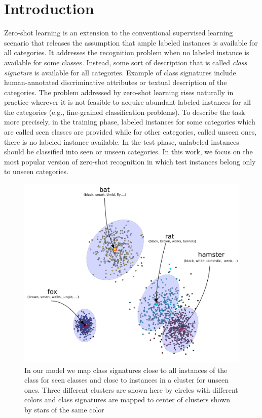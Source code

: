 \documentclass[letterpaper]{article}
\begin{document}
\section{Introduction}
Zero-shot learning \cite{bengio08,hinton09,lampert09,farhadi09} is an extension to the conventional supervised learning scenario
that releases the assumption that ample labeled instances is available for all categories. It addresses the
recognition problem when no labeled instance is available for some classes.
Instead, some sort of description that is called \textit{class signature} is available for all categories.
Example of class signatures include human-annotated discriminative attributes or textual description of the categories.
The problem addressed by zero-shot learning rises naturally in practice wherever it is not feasible to acquire abundant labeled instances for
 all the categories (e.g., fine-grained classification problems).
To describe the task more precisely, in the training phase, labeled instances for some categories which are called seen classes are provided
while for other categories, called unseen ones, there is no labeled instance available.
In the test phase, unlabeled instances should be classified into seen or unseen categories.
 In this work, we focus on the most popular version of zero-shot recognition in which test instances belong only to unseen categories.
 \begin{figure}[!t]
 \begin{center}
 \includegraphics[width=0.98\columnwidth]{overview.pdf}
 \caption{In our model we map class signatures close to all instances of the class for seen classes and close to instances in a cluster for unseen ones.
 Three different clusters are shown here by circles with different colors and class signatures are mapped to center of clusters shown by stars of the same color}
 \label{fig:overview}
 \end{center}
 \vspace{-8mm}
 \end{figure}
\end{document}
